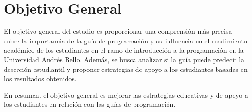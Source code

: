 \hypertarget{objetivo_general}{%
    \section{Objetivo General}\label{Objetivo General}}

El objetivo general del estudio es proporcionar una comprensión más precisa sobre la importancia de la guía de programación y su influencia en el rendimiento académico de los estudiantes en el ramo de introducción a la programación en la Universidad Andrés Bello. Además, se busca analizar si la guía puede predecir la deserción estudiantil y proponer estrategias de apoyo a los estudiantes basadas en los resultados obtenidos.

En resumen, el objetivo general es mejorar las estrategias educativas y de apoyo a los estudiantes en relación con las guías de programación.